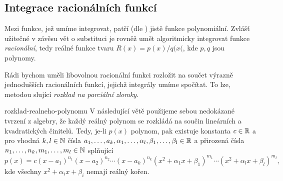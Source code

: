 \subsection{Integrace racionálních funkcí}
\label{ssec:integrace-racionalnich-funkci}

Mezi funkce, jež umíme  integrovat, patří (dle
) jistě funkce polynomiální. Zvlášť
užitečné v závěsu vět o substituci je rovněž umět algoritmicky integrovat funkce
\emph{racionální}, tedy reálné funkce tvaru $R(x) = p(x) / q(x($, kde $p,q$ jsou
polynomy.

Rádi bychom uměli libovolnou racionální funkci rozložit na součet výrazně
jednodušších racionálních funkcí, jejichž integrály umíme spočítat. To lze,
metodou slující \emph{rozklad na parciální zlomky}.

\begin{remark}{}{rozklad-realneho-polynomu}
 V následující větě použijeme sebou nedokázané tvrzení z algebry, že každý
 reálný polynom se rozkládá na součin lineárních a kvadratických činitelů. Tedy,
 je-li $p(x)$ polynom, pak existuje konstanta $c \in \mathbb{R}$ a pro vhodná $k,l \in
 \mathbb{N}$ čísla $a_1,\ldots,a_k,\alpha_1,\ldots,\alpha_l,\beta_1,\ldots,\beta_l \in
 \mathbb{R}$ a přirozená čísla $n_1,\ldots,n_k,m_1,\ldots,m_l \in \mathbb{N}$ splňující
 \[
  p(x) = c(x-a_1)^{n_1}(x-a_2)^{n_2} \cdots (x-a_k)^{n_k}(x^2 + \alpha_1 x +
  \beta_1)^{m_1} \cdots (x^2 + \alpha_l x + \beta_l)^{m_l},
 \]
 kde všechny $x^2 + \alpha_i x + \beta_i$ nemají reálný kořen.
\end{remark}

